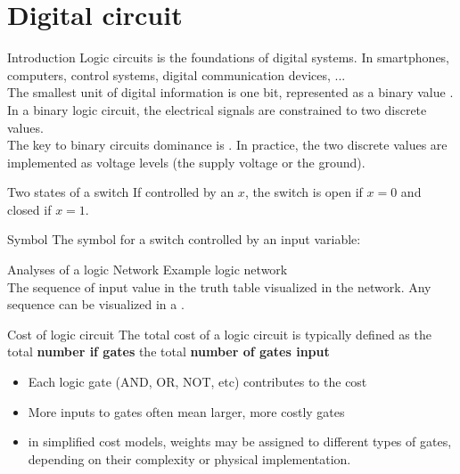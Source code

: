     \section{Digital circuit}
    
\begin{parag}{Introduction}
    Logic circuits is the foundations of digital systems. In smartphones, computers, control systems, digital communication devices, ...\\
    The smallest unit of digital information is one bit, represented as a binary value . \\
    In a binary logic circuit, the electrical signals are constrained to two discrete values. \\
    The key to binary circuits dominance is . In practice, the two discrete values are implemented as voltage levels (the supply voltage or the ground).
\end{parag}

\begin{parag}{Two states of a switch}
    If controlled by an  $x$, the switch is open if $x = 0$ and closed if $x = 1$.
\end{parag}

\begin{parag}{Symbol}
    The symbol for a switch controlled by an input variable:
\end{parag}

\begin{parag}{Analyses of a logic Network}
    Example logic network \\
    The sequence of input value in the truth table visualized in the network. Any sequence can be visualized in a .
\end{parag}

\begin{parag}{Cost of logic circuit}
    The total cost of a logic circuit is typically defined as the total \textbf{number if gates}  the total \textbf{number of gates input}
    \begin{itemize}
        \item Each logic gate (AND, OR, NOT, etc) contributes to the cost
        \item More inputs to gates often mean larger, more costly gates
        \item in simplified cost models, weights may be assigned to different types of gates, depending on their complexity or physical implementation.
    \end{itemize}

\end{parag}

